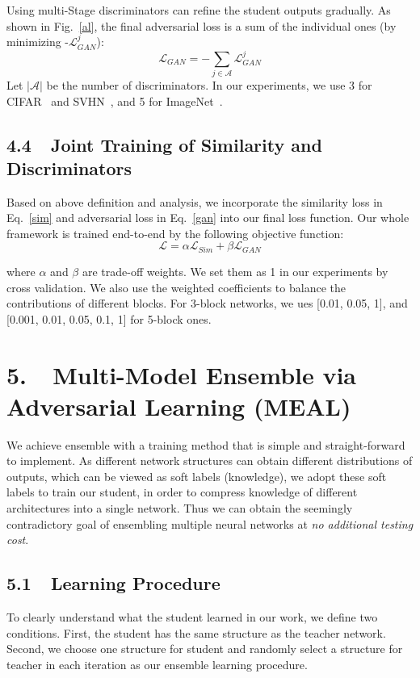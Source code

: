 \documentclass[letterpaper]{article} %
\newcommand{\LL}{\mathcal{L}}
\begin{document}
Using multi-Stage discriminators can refine the student outputs gradually.
As shown in Fig.~\ref{al}, the final adversarial loss is a sum of the individual ones (by minimizing -$\LL^j_{GAN}$):
\begin{equation} \label{gan}
\LL_{GAN}  = -\sum\limits_{j\in {\mathcal{A}}} { \LL^j_{ GAN}}
\end{equation}
Let $\left| \mathcal{A} \right|$ be the number of discriminators. In our experiments, we use 3 for CIFAR~\cite{krizhevsky2009learning} and SVHN~\cite{netzer2011reading}, and 5 for ImageNet~\cite{deng2009imagenet}.

\subsection{4.4~~Joint Training of Similarity and Discriminators}
Based on above definition and analysis, we incorporate the similarity loss in Eq.~\ref{sim} and adversarial loss in Eq.~\ref{gan} into our final loss function. Our whole framework is trained end-to-end by the following objective function: 
\begin{equation}\label{final_loss}
\LL = \alpha \LL_{Sim} + \beta \LL_{GAN}
\end{equation}

where $\alpha$ and $\beta$ are trade-off weights. We set them as 1 in our experiments by cross validation. We also use the weighted coefficients to balance the contributions of different blocks. For 3-block networks, we ues [0.01, 0.05, 1], and [0.001, 0.01, 0.05, 0.1, 1] for 5-block ones.

\section{5.~~Multi-Model Ensemble via Adversarial Learning (MEAL)}
We achieve ensemble with a training method that is simple and straight-forward to implement.
As different network structures can obtain different distributions of outputs, which can be viewed as soft labels (knowledge), we adopt these soft labels to train our student, in order to compress knowledge of different architectures into a single network. Thus we can obtain the seemingly contradictory goal of ensembling multiple neural networks at {\em {no additional testing cost}}. 

\subsection{5.1~~Learning Procedure}
To clearly understand what the student learned in our work, we define two conditions. First, the student has the same structure as the teacher network. Second, we choose one structure for student and randomly select a structure for teacher in each iteration as our ensemble learning procedure.
\end{document}
